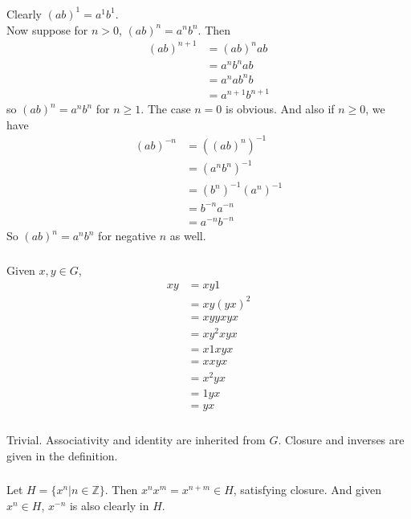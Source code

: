 \documentclass{article}
\newcommand{\ints}{\mathbb{Z}}
\newcommand{\set}[1]{ \{ #1 \} }
\newcommand{\inv}[1]{ {#1}^{-1} }
\begin{document}
\subsubsection{}\label{ex1p24} 
Clearly $(ab)^1 = a^1b^1$. 
\\
Now suppose for $n>0$, $(ab)^n = a^nb^n$. Then
\begin{align*}
(ab)^{n+1} &= (ab)^nab\\
&= a^nb^nab\\
&= a^nab^nb\\
&= a^{n+1}b^{n+1}
\end{align*}
so $(ab)^n = a^nb^n$ for $n \geq 1$. The case $n=0$ is obvious. And also if $n \geq 0$, we have
\begin{align*}
(ab)^{-n} &= \inv{((ab)^n)}\\
&= \inv{(a^nb^n)}\\
&= \inv{(b^n)}\inv{(a^n)}\\
&= b^{-n}a^{-n}\\
&= a^{-n}b^{-n}
\end{align*}
So $(ab)^n = a^nb^n$ for negative $n$ as well.
\subsubsection{}
Given $x,y\in G$,
\begin{align*}
xy &= xy1\\
&=xy(yx)^2\\
&=xyyxyx\\
&=xy^2xyx\\
&=x1xyx\\
&=xxyx\\
&=x^2yx\\
&=1yx\\
&=yx
\end{align*}
\subsubsection{}
Trivial. Associativity and identity are inherited from $G$. Closure and inverses are given in the definition.
\subsubsection{}
Let $H = \set{x^n | n \in \ints}$. Then $x^nx^m = x^{n+m} \in H$, satisfying closure. And given $x^n \in H$, $x^{-n}$ is also clearly in $H$.
\end{document}

